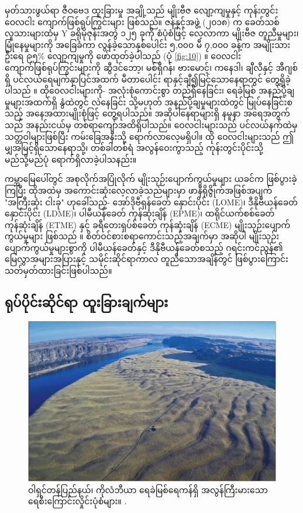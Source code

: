 \documentclass[10pt,twocolumn,letterpaper]{article}
\begin{document}
မှတ်သားဖွယ်ရာ ဇီဝဗေဒ ထူးခြားမှု အချို့သည် မျိုးဗီဇ လျော့ကျမှုနှင့် ကုန်းတွင်း ဝေလငါး ကျောက်ဖြစ်ရုပ်ကြွင်းများ ဖြစ်သည်။ ဇန်နှင့်အဖွဲ့ (၂၀၁၈) က ခေတ်သစ်လူသားများထံမှ Y ခရိုမိုဇုန်းအတွဲ ၁၂၅ ခုကို စံပုံစံဖြင့် လေ့လာကာ မျိုးဗီဇ တူညီမှုများ၊ မြုံနေမှုများကို အခြေခံကာ လွန်ခဲ့သောနှစ်ပေါင်း ၅,၀၀၀ မီ ၇,၀၀၀ ခန့်က အမျိုးသားဦးရေ ၉၅\% လျော့ကျမှုကို ဖော်ထုတ်ခဲ့ပါသည် (ပုံ \ref{fig:10}) \cite{62}။ ဝေလငါး ကျောက်ဖြစ်ရုပ်ကြွင်းများကို ဆွီဒင်ဘော့၊ မစ်ရှီဂန်၊ ဗားမောင့်၊ ကနေဒါ၊ ချီလီနှင့် အီဂျစ်ရှိ ပင်လယ်ရေမျက်နှာပြင်အထက် မီတာပေါင်း ရာနှင့်ချီ၍မြင့်သောနေရာတွင် တွေ့ရှိခဲ့ပါသည် \cite{63,64,65,66}။ ထိုဝေလငါးများကို- အလုံးစုံကောင်းစွာ တည်ရှိနေခြင်း၊ ရေခဲမြစ် အနည်ပို့ချမှုများအထက်ရှိ နွံထဲတွင် လဲနေခြင်း သို့မဟုတ် အနည်ပို့ချမှုများထဲတွင် မြုပ်နေခြင်းစသည့် အနေအထားမျိုးစုံဖြင့် တွေ့ရပါသည်။ အဆိုပါနေရာများရှိ နမူနာ အရေအတွက်သည် အနည်းငယ်မှ တစ်ရာကျော်အထိရှိပါသည်။ ဝေလငါးများသည် ပင်လယ်နက်ထဲမှ သတ္တဝါများဖြစ်ပြီး ကမ်းခြေအနီးသို့ ရောက်လာလေ့မရှိပါ။ ထို ဝေလငါးများသည် ဤမျှအမြင့်ရှိသောနေရာသို့၊ တစ်ခါတစ်ရံ အလွန်ဝေးကွာသည့် ကုန်းတွင်းပိုင်းသို့ မည်သို့မည်ပုံ ရောက်ရှိလာခဲ့ပါသနည်း။

ကမ္ဘာမြေပေါ်တွင် အစုလိုက်အပြုံလိုက် မျိုးသုဉ်းပျောက်ကွယ်မှုများ ယခင်က ဖြစ်ပွားခဲ့ကြပြီး ထိုအထဲမှ အကောင်းဆုံးလေ့လာခဲ့သည်များမှာ ဖာနီရိုဇွိုက်အဖြစ်အပျက် "အကြီးဆုံး ငါးခု" ဟုခေါ်သည့်- အော်ဒိုဗီရှန်ခေတ် နှောင်းပိုင်း (LOME)၊ ဒီနိုဗီယန်ခေတ် နှောင်းပိုင်း (LDME)၊ ပါမီယန်ခေတ် ကုန်ဆုံးချိန် (EPME)၊ ထရိုင်ယက်စစ်ခေတ် ကုန်ဆုံးချိန် (ETME) နှင့် ခရီတေးရှပ်စ်ခေတ် ကုန်ဆုံးချိန် (ECME) မျိုးသုဉ်းပျောက်ကွယ်မှုများ ဖြစ်သည် \cite{88,89}။ စိတ်ဝင်စားစရာကောင်းသည့်အချက်မှာ အဆိုပါ မျိုးသုဉ်းပျောက်ကွယ်မှုများစွာကို ပါမီယန်ခေတ်နှင့် ဒီနိုဗီယန်ခေတ်စသည့် ဂရင်းကင်ညွန်၏ မြေလွှာအများအပြားနှင့် သမိုင်းဆိုင်ရာကာလ တူညီသောအချိန်တွင် ဖြစ်ပွားကြောင်း သတ်မှတ်ထားခြင်းဖြစ်ပါသည်။

\subsection{ရုပ်ပိုင်းဆိုင်ရာ ထူးခြားချက်များ}

\begin{figure}[b]
\begin{center}
   \includegraphics[width=1\linewidth]{columbia.jpg}
\end{center}
   \caption{ဝါရှင်တန်ပြည်နယ်၊ ကိုလံဘီယာ ရေခဲမြစ်ရေကန်ရှိ အလွန်ကြီးမားသော ရေစီးကြောင်းလှိုင်းပုံစံများ။ \cite{80}.}
\label{fig:11}
\label{fig:onecol}
\end{figure}
\end{document}
